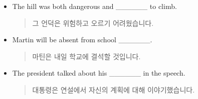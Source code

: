 \documentclass{article}
\begin{document}
\begin{addmargin}[1em]{1em}
\begin{itemize}
\begin{quote}
    \end{quote}
    \item The hill was both dangerous and \_\_\_\_\_\_ to climb.
    \begin{quote}
    그 언덕은 위험하고 오르기 어려웠습니다.
    \end{quote}
    \item Martin will be absent from school \_\_\_\_\_\_.
    \begin{quote}
    마틴은 내일 학교에 결석할 것입니다.
    \end{quote}
    \item The president talked about his \_\_\_\_\_\_ in the speech.
    \begin{quote}
    대통령은 연설에서 자신의 계획에 대해 이야기했습니다.
    \end{quote}
\end{itemize}
\end{addmargin}
\end{document}
